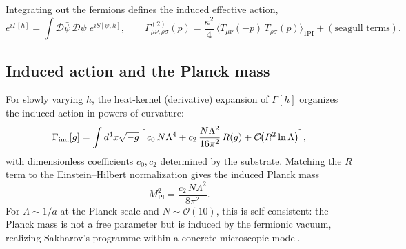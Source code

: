 \documentclass[11pt,a4paper]{article}
\begin{document}
Integrating out the fermions defines the induced effective action,
\begin{equation}
e^{i\Gamma[h]} = \int \mathcal{D}\bar\psi\,\mathcal{D}\psi\;
e^{iS[\psi,h]},
\qquad
\Gamma^{(2)}_{\mu\nu,\rho\sigma}(p)
= \frac{\kappa^2}{4}\,
\bigl\langle T_{\mu\nu}(-p)\,T_{\rho\sigma}(p)
\bigr\rangle_{\mathrm{1PI}}
+ (\text{seagull terms}).
\label{eq:Gamma2}
\end{equation}

\subsection{Induced action and the Planck mass}

For slowly varying $h$, the heat-kernel (derivative) expansion of
$\Gamma[h]$ organizes the induced action in powers of curvature:
\begin{equation}
\Gamma_{\mathrm{ind}}[g] = \int d^4x \sqrt{-g}\,
\Bigl[\, c_0\,N\Lambda^4
+ c_2\,\frac{N\Lambda^2}{16\pi^2}\,R(g)
+ \mathcal{O}\!\bigl(R^2 \ln\Lambda\bigr) \Bigr],
\label{eq:induced}
\end{equation}
with dimensionless coefficients $c_0, c_2$ determined by the
substrate.
Matching the $R$ term to the Einstein--Hilbert normalization gives
the induced Planck mass
\begin{equation}
M_{\mathrm{Pl}}^2 = \frac{c_2\,N\Lambda^2}{8\pi^2}.
\label{eq:Mpl}
\end{equation}
For $\Lambda \sim 1/a$ at the Planck scale and
$N \sim \mathcal{O}(10)$, this is self-consistent: the Planck mass
is not a free parameter but is induced by the fermionic vacuum,
realizing Sakharov's programme within a concrete microscopic model.
\end{document}
